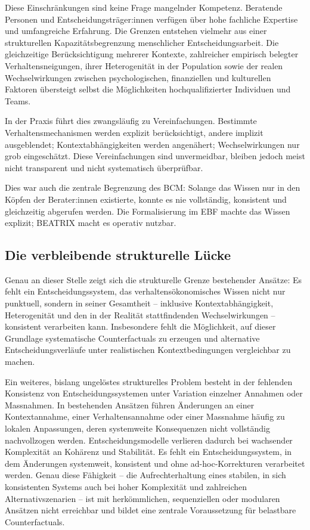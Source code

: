 \documentclass[11pt,a4paper]{article}
\begin{document}
Diese Einschränkungen sind keine Frage mangelnder Kompetenz. Beratende Personen und Entscheidungsträger:innen verfügen über hohe fachliche Expertise und umfangreiche Erfahrung. Die Grenzen entstehen vielmehr aus einer strukturellen Kapazitätsbegrenzung menschlicher Entscheidungsarbeit. Die gleichzeitige Berücksichtigung mehrerer Kontexte, zahlreicher empirisch belegter Verhaltensneigungen, ihrer Heterogenität in der Population sowie der realen Wechselwirkungen zwischen psychologischen, finanziellen und kulturellen Faktoren übersteigt selbst die Möglichkeiten hochqualifizierter Individuen und Teams.

In der Praxis führt dies zwangsläufig zu Vereinfachungen. Bestimmte Verhaltensmechanismen werden explizit berücksichtigt, andere implizit ausgeblendet; Kontextabhängigkeiten werden angenähert; Wechselwirkungen nur grob eingeschätzt. Diese Vereinfachungen sind unvermeidbar, bleiben jedoch meist nicht transparent und nicht systematisch überprüfbar.

Dies war auch die zentrale Begrenzung des BCM: Solange das Wissen nur in den Köpfen der Berater:innen existierte, konnte es nie vollständig, konsistent und gleichzeitig abgerufen werden. Die Formalisierung im EBF machte das Wissen explizit; BEATRIX macht es operativ nutzbar.

\subsection{Die verbleibende strukturelle Lücke}

Genau an dieser Stelle zeigt sich die strukturelle Grenze bestehender Ansätze: Es fehlt ein Entscheidungssystem, das verhaltensökonomisches Wissen nicht nur punktuell, sondern in seiner Gesamtheit -- inklusive Kontextabhängigkeit, Heterogenität und den in der Realität stattfindenden Wechselwirkungen -- konsistent verarbeiten kann. Insbesondere fehlt die Möglichkeit, auf dieser Grundlage systematische Counterfactuals zu erzeugen und alternative Entscheidungsverläufe unter realistischen Kontextbedingungen vergleichbar zu machen.

Ein weiteres, bislang ungelöstes strukturelles Problem besteht in der fehlenden Konsistenz von Entscheidungssystemen unter Variation einzelner Annahmen oder Massnahmen. In bestehenden Ansätzen führen Änderungen an einer Kontextannahme, einer Verhaltensannahme oder einer Massnahme häufig zu lokalen Anpassungen, deren systemweite Konsequenzen nicht vollständig nachvollzogen werden. Entscheidungsmodelle verlieren dadurch bei wachsender Komplexität an Kohärenz und Stabilität. Es fehlt ein Entscheidungssystem, in dem Änderungen systemweit, konsistent und ohne ad-hoc-Korrekturen verarbeitet werden. Genau diese Fähigkeit -- die Aufrechterhaltung eines stabilen, in sich konsistenten Systems auch bei hoher Komplexität und zahlreichen Alternativszenarien -- ist mit herkömmlichen, sequenziellen oder modularen Ansätzen nicht erreichbar und bildet eine zentrale Voraussetzung für belastbare Counterfactuals.
\end{document}
